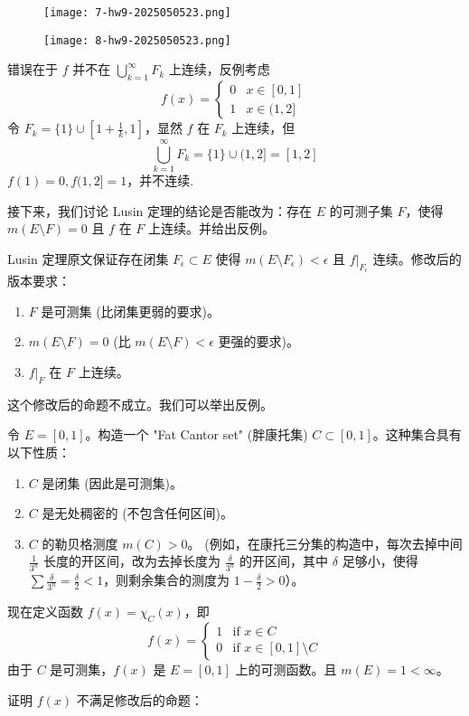 \begin{exercise}
\begin{figure}[H]
\centering
\texttt{[image: 7-hw9-2025050523.png]}
\label{}
\end{figure}
\begin{figure}[H]
\centering
\texttt{[image: 8-hw9-2025050523.png]}
\label{}
\end{figure}
\end{exercise}
错误在于 $f$ 并不在 $\bigcup_{k=1}^{\infty}F_k$ 上连续，反例考虑
\[
f(x)=\begin{cases}
0 & x\in[0,1] \\
1 & x\in(1,2]
\end{cases}
\]
令 $F_k=\{ 1 \}\cup[1+\frac{1}{k},1]$，显然 $f$ 在 $F_k$ 上连续，但
\[
\bigcup_{k=1}^{\infty } F_k=\{ 1 \}\cup(1,2]=[1,2]
\]
$f(1)=0,f(1,2]=1$，并不连续.

接下来，我们讨论 Lusin 定理的结论是否能改为：存在 $E$ 的可测子集 $F$，使得 $m(E \setminus F)=0$ 且 $f$ 在 $F$ 上连续。并给出反例。

Lusin 定理原文保证存在闭集 $F_\epsilon \subset E$ 使得 $m(E \setminus F_\epsilon) < \epsilon$ 且 $f|_{F_\epsilon}$ 连续。修改后的版本要求：

\begin{enumerate}
	\item $F$ 是可测集 (比闭集更弱的要求)。
	\item $m(E \setminus F)=0$ (比 $m(E \setminus F) < \epsilon$ 更强的要求)。
	\item $f|_F$ 在 $F$ 上连续。
\end{enumerate}

这个修改后的命题不成立。我们可以举出反例。

\begin{example}
令 $E=[0,1]$。构造一个 "Fat Cantor set" (胖康托集) $C \subset [0,1]$。这种集合具有以下性质：
	\begin{enumerate}
		\item $C$ 是闭集 (因此是可测集)。
		\item $C$ 是无处稠密的 (不包含任何区间)。
		\item $C$ 的勒贝格测度 $m(C)>0$。 (例如，在康托三分集的构造中，每次去掉中间 $\frac{1}{3^n}$ 长度的开区间，改为去掉长度为 $\frac{\delta}{3^n}$ 的开区间，其中 $\delta$ 足够小，使得 $\sum \frac{\delta}{3^n} = \frac{\delta}{2} < 1$，则剩余集合的测度为 $1-\frac{\delta}{2}>0$）。
	\end{enumerate}
现在定义函数 $f(x)=\chi_C(x)$，即
\[
f(x)=
\begin{cases}
1 & \text{if } x \in C \\
0 & \text{if } x \in [0,1] \setminus C
\end{cases}
\]由于 $C$ 是可测集，$f(x)$ 是 $E=[0,1]$ 上的可测函数。且 $m(E)=1 < \infty$。
\end{example}
证明 $f(x)$ 不满足修改后的命题：

